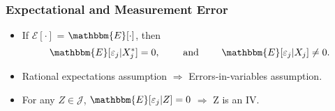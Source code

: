 \documentclass[notes=show]{beamer}
\begin{document}
\begin{frame}
\frametitle{Expectational and Measurement Error}

\begin{itemize}
	\item If $\mathcal{E}[\cdot]$ = $\mathbbm{E}[\cdot]$, then
	\begin{equation*}
	\mathbbm{E}[\varepsilon_{j}|X^{*}_{j}]=0,\qquad\text{ and }\qquad\mathbbm{E}[\varepsilon_{j}|X_{j}]\neq0.
	\end{equation*}
	\item Rational expectations assumption $\Longrightarrow$ Errors-in-variables assumption.
	\item For any $Z\in\mathcal{J}$, $\mathbbm{E}[\varepsilon_{j}|Z]=0$ $\Longrightarrow$ Z is an IV.
\end{itemize}
\end{frame}

\end{document}
